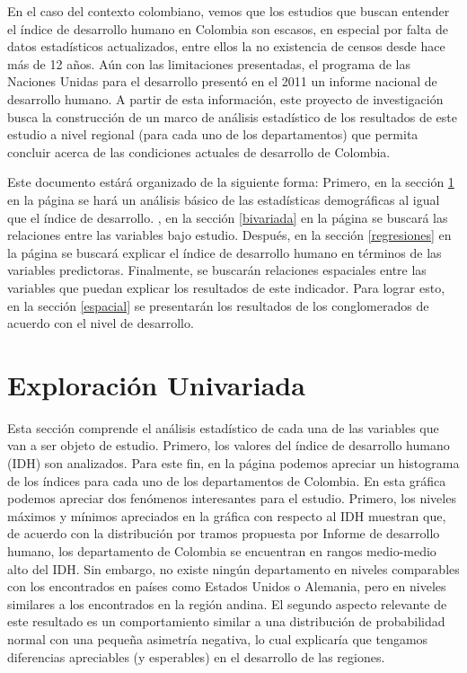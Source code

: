 \documentclass{article}
\begin{document}
En el caso del contexto colombiano, vemos que los estudios que buscan entender el índice de desarrollo humano en Colombia son escasos, en especial por falta de datos estadísticos actualizados, entre ellos la no existencia de censos desde hace más de 12 años. Aún con las limitaciones presentadas, el programa de las Naciones Unidas para el desarrollo presentó en el 2011 un informe nacional de desarrollo humano. A partir de esta información, este proyecto de investigación busca la construcción de un marco de análisis estadístico de los resultados de este estudio a nivel regional (para cada uno de los departamentos) que permita concluir acerca de las condiciones actuales de desarrollo de Colombia.


Este documento estárá organizado de la siguiente forma: Primero, en la sección \ref{univariada} en la página \pageref{univariada} se hará un análisis básico de las estadísticas demográficas al igual que el índice de desarrollo. , en la sección \ref{bivariada} en la página \pageref{bivariada} se buscará las relaciones entre las variables bajo estudio. Después, en la sección \ref{regresiones} en la página \pageref{regresiones} se buscará explicar el índice de desarrollo humano en términos de las variables predictoras. Finalmente, se buscarán relaciones espaciales entre las variables que puedan explicar los resultados de este indicador. Para lograr esto, en la sección \ref{espacial} se presentarán los resultados de los conglomerados de acuerdo con el nivel de desarrollo.


\section{Exploración Univariada}\label{univariada}

Esta sección comprende el análisis estadístico de cada una de las variables que van a ser objeto de estudio. Primero, los valores del índice de desarrollo humano (IDH) son analizados. Para este fin, en la página \pageref{barplots} podemos apreciar un histograma de los índices para cada uno de los departamentos de Colombia. En esta gráfica podemos apreciar dos fenómenos interesantes para el estudio. Primero, los niveles máximos y mínimos apreciados en la gráfica con respecto al IDH muestran que, de acuerdo con la distribución por tramos propuesta por Informe de desarrollo humano, los departamento de Colombia se encuentran en rangos medio-medio alto del IDH. Sin embargo, no existe ningún departamento en niveles comparables con los encontrados en países como Estados Unidos o Alemania, pero en niveles similares a los encontrados en la región andina. El segundo aspecto relevante de este resultado es un comportamiento similar a una distribución de probabilidad normal con una pequeña asimetría negativa, lo cual explicaría que tengamos diferencias apreciables (y esperables) en el desarrollo de las regiones.
\clearpage
\end{document}
